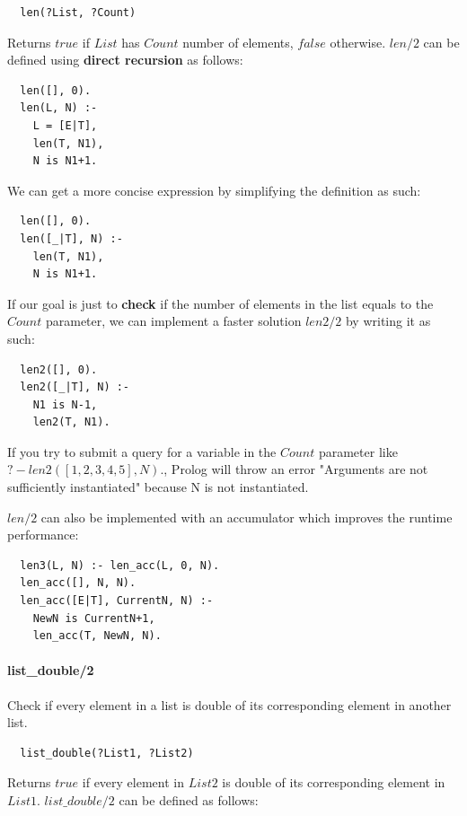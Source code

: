 \documentclass{article}
\begin{document}
\begin{multicols}{2}
  \begin{lstlisting}
  len(?List, ?Count)
  \end{lstlisting} 
  
  Returns $true$ if $List$ has $Count$ number of elements, $false$ otherwise. $len/2$ can be defined using {\bf direct recursion} as follows:
  
  \begin{lstlisting}
  len([], 0).
  len(L, N) :-
	L = [E|T],
	len(T, N1),
	N is N1+1.
  \end{lstlisting} 
  
  We can get a more concise expression by simplifying the definition as such:  
  
  \begin{lstlisting}
  len([], 0).
  len([_|T], N) :-
	len(T, N1),
	N is N1+1.
  \end{lstlisting} 

  If our goal is just to {\bf check} if the number of elements in the list equals to the $Count$ parameter, we can implement a faster solution $len2/2$ by writing it as such:
  
  \begin{lstlisting} 
  len2([], 0).
  len2([_|T], N) :-
    N1 is N-1,
  	len2(T, N1).
  \end{lstlisting}
  
  If you try to submit a query for a variable in the $Count$ parameter like $?- len2([1, 2, 3, 4, 5], N).$, Prolog will throw an error "Arguments are not sufficiently instantiated" because N is not instantiated.
  
  $len/2$ can also be implemented with an accumulator which improves the runtime performance:
  
  \begin{lstlisting} 
  len3(L, N) :- len_acc(L, 0, N).
  len_acc([], N, N).
  len_acc([E|T], CurrentN, N) :-
	NewN is CurrentN+1,
	len_acc(T, NewN, N).
  \end{lstlisting}  
  
  \paragraph{list\_double/2} Check if every element in a list is double of its corresponding element in another list.
  
  \begin{lstlisting}
  list_double(?List1, ?List2)
  \end{lstlisting} 
  
  Returns $true$ if every element in $List2$ is double of its corresponding element in $List1$. $list\_double/2$ can be defined as follows:


\end{multicols}
\end{document}

